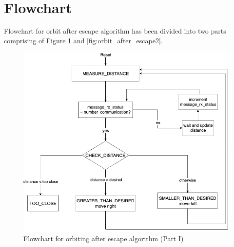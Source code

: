 \documentclass{report}[12pt]
\begin{document}
\section{Flowchart}
Flowchart for orbit after escape algorithm has been divided into two parts comprising of Figure \ref{fig:orbit_after_escape1} and \ref{fig:orbit_after_escape2}.
\begin{figure}[H]
    \centering
    \includegraphics[scale=0.55]{star_planet_escape1}
    \caption{Flowchart for orbiting after escape algorithm (Part I)}
    \label{fig:orbit_after_escape1}
\end{figure}
\end{document}
